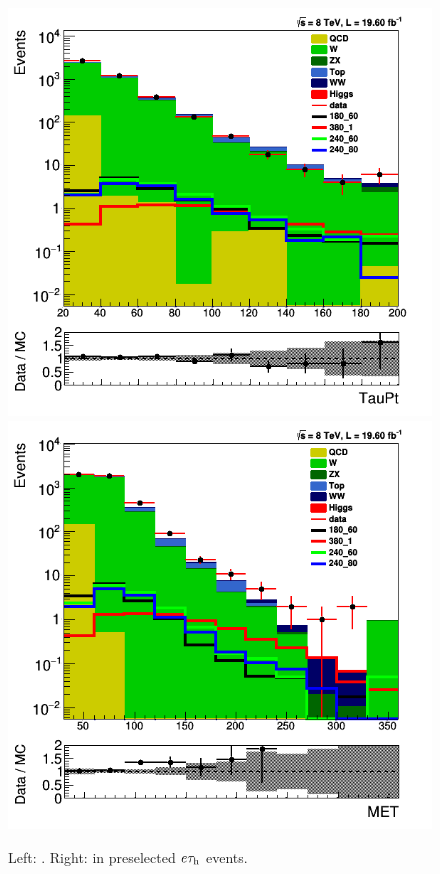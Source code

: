 \begin{figure}[!Hhtb]
\centering
\includegraphics[angle=0,scale=0.375]{SelectionEleTau/TauPt.png}
\includegraphics[angle=0,scale=0.375]{SelectionEleTau/MET.png}
\caption{Left: \Tau\PT. Right: \MPT in preselected $e\tau_{\rm h}$ events.}
\label{fig:datamceletau}
\end{figure}

